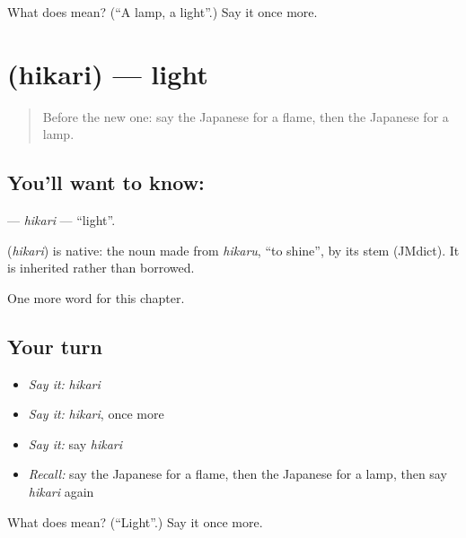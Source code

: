 \begin{tcolorbox}[breakable,colback=teal!4,colframe=teal!35!black,title={Before you move on}]
What does  mean? (\textquotedblleft{}A lamp, a light\textquotedblright{}.) Say it once more.
\end{tcolorbox}
\section[\texorpdfstring{\ja{ひかり} (hikari)}{ひかり (hikari)}]{ (hikari) — light}

\label{lesson:JA-C105-hikari}



\begin{quote}
Before the new one: say the Japanese for a flame, then the Japanese for a lamp.
\end{quote}

\subsection*{You'll want to know: }
\textbf{} — \emph{hikari} — \textquotedblleft{}light\textquotedblright{}.

\begin{cousinweb}
\textbf{} (\emph{hikari}) is native: the noun made from \emph{hikaru}, \textquotedblleft{}to shine\textquotedblright{}, by its stem (JMdict). It is inherited rather than borrowed.
\end{cousinweb}

\begin{grammarlens}[title={What you've built}]
One more word for this chapter.
\end{grammarlens}

\subsection*{Your turn}
\begin{itemize}
\raggedright
  \item \emph{Say it:} \emph{hikari}
  \item \emph{Say it:} \emph{hikari}, once more
  \item \emph{Say it:} say \emph{hikari}
  \item \emph{Recall:} say the Japanese for a flame, then the Japanese for a lamp, then say \emph{hikari} again
\end{itemize}

\begin{tcolorbox}[breakable,colback=teal!4,colframe=teal!35!black,title={Before you move on}]
What does  mean? (\textquotedblleft{}Light\textquotedblright{}.) Say it once more.
\end{tcolorbox}
